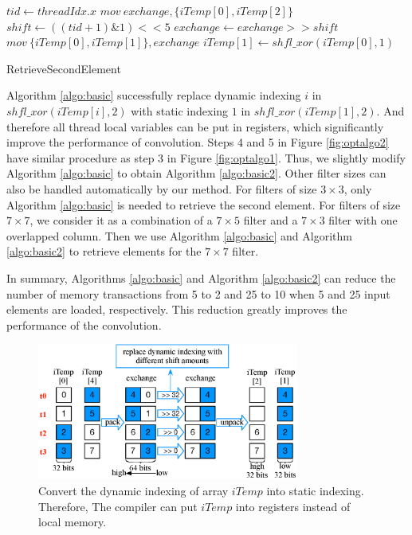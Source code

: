 \begin{algorithm}[t!]
	$tid \gets threadIdx.x$\;
	$mov\ exchange, \{iTemp[0], iTemp[2]\}$\;
	$shift \gets ((tid+1)\&1)<<5$\;
	$exchange \gets exchange >> shift$\;
	$mov\ \{iTemp[0],iTemp[1]\}, exchange$\;
	$iTemp[1] \gets shfl\_xor(iTemp[0],1)$\;	
	\caption{RetrieveSecondElement}
	\label{algo:basic2}
\end{algorithm}

Algorithm \ref{algo:basic} successfully replace dynamic indexing $i$ in $shfl\_xor(iTemp[i],2)$ with static indexing $1$ in $shfl\_xor(iTemp[1],2)$. {\color{red}And therefore all thread local variables can be put in registers,} which significantly improve the performance of convolution. Steps 4 and 5 in Figure \ref{fig:optalgo2} have similar procedure as step 3 in Figure \ref{fig:optalgo1}. Thus, we slightly modify Algorithm \ref{algo:basic} to obtain Algorithm \ref{algo:basic2}. {\color{red}Other filter sizes can also be handled automatically by our method. For filters of size $3 \times 3$, only Algorithm \ref{algo:basic} is needed to retrieve the second element. For filters of size $7 \times 7$, we consider it as a combination of a $7 \times 5$ filter and a $7 \times 3$ filter with one overlapped column. Then we use Algorithm \ref{algo:basic} and Algorithm \ref{algo:basic2} to retrieve elements for the $7 \times 7$ filter.}

In summary, Algorithms \ref{algo:basic} and Algorithm \ref{algo:basic2} can reduce the number of memory transactions from 5 to 2 and 25 to 10 when 5 and 25 input elements are loaded, respectively. This reduction greatly improves the performance of the convolution.


\begin{figure}[t!]
	\centering
	\includegraphics[width=\columnwidth,height=4.5cm]{./figure/exchange.eps}
\caption{Convert the dynamic indexing of array $iTemp$ into static indexing. Therefore, The compiler can put $iTemp$ into registers instead of local memory.}
\label{fig:exchange}
\end{figure}



